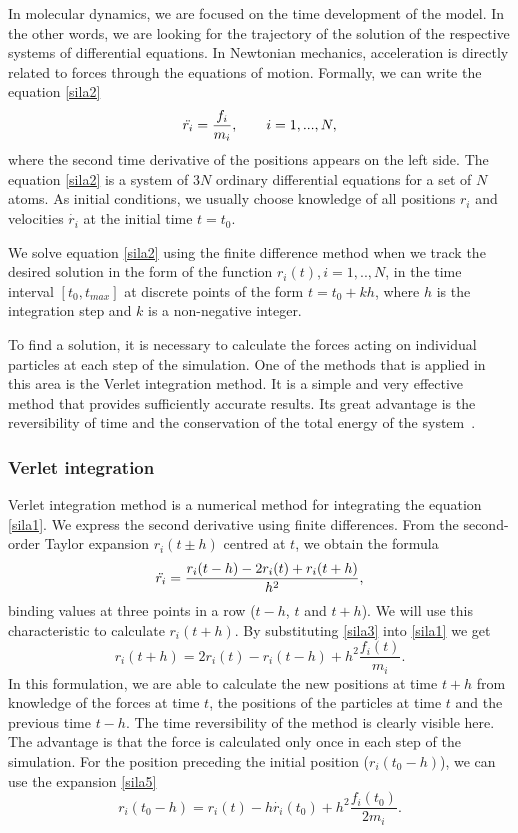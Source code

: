 In molecular dynamics, we are focused on the time development of the model. In the other words, we are looking for the trajectory of the solution of the respective systems of differential equations. In Newtonian mechanics, acceleration is directly related to forces through the equations of motion. Formally, we can write the equation \ref{sila2}
\begin{equation}\label{sila2}
	\Ddot{r_i}=\frac{f_i}{m_i}, \qquad i=1,...,N,
\end{equation}
where the second time derivative of the positions appears on the left side. The equation \ref{sila2} is a system of 3$N$ ordinary differential equations for a set of $N$ atoms. As initial conditions, we usually choose knowledge of all positions $r_i$ and velocities $\dot{r_i}$ at the initial time $t=t_0$. 

We solve equation \ref{sila2} using the finite difference method when we track the desired solution in the form of the function $r_i(t), i=1,..,N$, in the time interval $[t_0,t_{max}]$ at discrete points of the form $t=t_0+kh$, where $h$ is the integration step and $k$ is a non-negative integer.

To find a solution, it is necessary to calculate the forces acting on individual particles at each step of the simulation. One of the methods that is applied in this area is the Verlet integration method. It is a simple and very effective method that provides sufficiently accurate results. Its great advantage is the reversibility of time and the conservation of the total energy of the system~\cite{mdskripta}.

\subsubsection{Verlet integration}
Verlet integration method is a numerical method for integrating the equation \ref{sila1}. We express the second derivative using finite differences. From the second-order Taylor expansion $r_i(t\pm h)$ centred at $t$, we obtain the formula
\begin{equation}\label{sila3}
	\Ddot{r_i}=\frac{r_i(t-h)-2r_i(t)+r_i(t+h)}{h^2},
\end{equation}
binding values at three points in a row ($t-h$, $t$ and $t+h$). We will use this characteristic to calculate $r_i(t+h)$. By substituting \ref{sila3} into \ref{sila1} we get 
\begin{equation}\label{sila4}
	r_i(t+h)=2r_i(t)-r_i(t-h)+h^2\frac{f_i(t)}{m_i}.
\end{equation}
In this formulation, we are able to calculate the new positions at time $t+h$ from knowledge of the forces at time $t$, the positions of the particles at time $t$ and the previous time $t-h$. The time reversibility of the method is clearly visible here. The advantage is that the force is calculated only once in each step of the simulation. For the position preceding the initial position ($r_i(t_0-h)$), we can use the expansion \ref{sila5}
\begin{equation}\label{sila5}
	r_i(t_0-h)=r_i(t)-h\dot{r_i}(t_0)+h^2\frac{f_i(t_0)}{2m_i}.
\end{equation}

